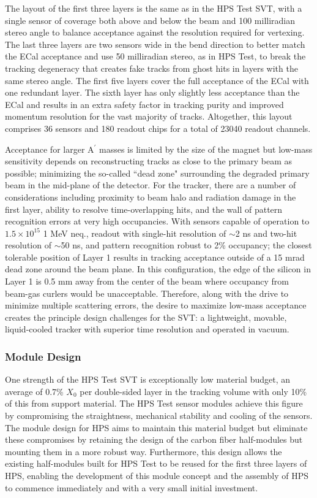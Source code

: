 The layout of the first three layers is the same as in the HPS Test SVT, with a single sensor of coverage both above and below the beam and 100 milliradian stereo angle to balance acceptance against the resolution required for vertexing.  The last three layers are two sensors wide in the bend direction to better match the ECal acceptance and use 50 milliradian stereo, as in HPS Test, to break the tracking degeneracy that creates fake tracks from ghost hits in layers with the same stereo angle.  The first five layers cover the full acceptance of the ECal with one redundant layer.  The sixth layer has only slightly less acceptance than the ECal and results in an extra safety factor in tracking purity and improved momentum resolution for the vast majority of tracks.  Altogether, this layout comprises 36 sensors and 180 readout chips for a total of 23040 readout channels.

Acceptance for larger A$^\prime$ masses is limited by the size of the magnet but low-mass sensitivity depends on reconstructing tracks as close to the primary beam as possible; minimizing the so-called ``dead zone" surrounding the degraded primary beam in the mid-plane of the detector.  For the tracker, there are a number of considerations including proximity to beam halo and radiation damage in the first layer, ability to resolve time-overlapping hits, and the wall of pattern recognition errors at very high occupancies. With sensors capable of operation to $1.5 \times 10^{15}$ 1 MeV neq., readout with single-hit resolution of $\sim$2 ns and two-hit resolution of $\sim$50 ns, and pattern recognition robust to 2\% occupancy; the closest tolerable position of Layer 1 results in tracking acceptance outside of a 15 mrad dead zone around the beam plane.  In this configuration, the edge of the silicon in Layer 1 is 0.5 mm away from the center of the beam where occupancy from beam-gas curlers would be unacceptable. Therefore, along with the drive to minimize multiple scattering errors, the desire to maximize low-mass acceptance creates the principle design challenges for the SVT: a lightweight, movable, liquid-cooled tracker with superior time resolution and operated in vacuum.

\subsubsection{Module Design}

One strength of the HPS Test SVT is exceptionally low material budget, an average of 0.7\% $X_0$ per double-sided layer in the tracking volume with only 10\% of this from support material.  The HPS Test sensor modules achieve this figure by compromising the straightness, mechanical stability and cooling of the sensors.  The module design for HPS aims to maintain this material budget but eliminate these compromises by retaining the design of the carbon fiber half-modules but mounting them in a more robust way. Furthermore, this design allows the existing half-modules built for HPS Test to be reused for the first three layers of HPS, enabling the development of this module concept and the assembly of HPS to commence immediately and with a very small initial investment. 

